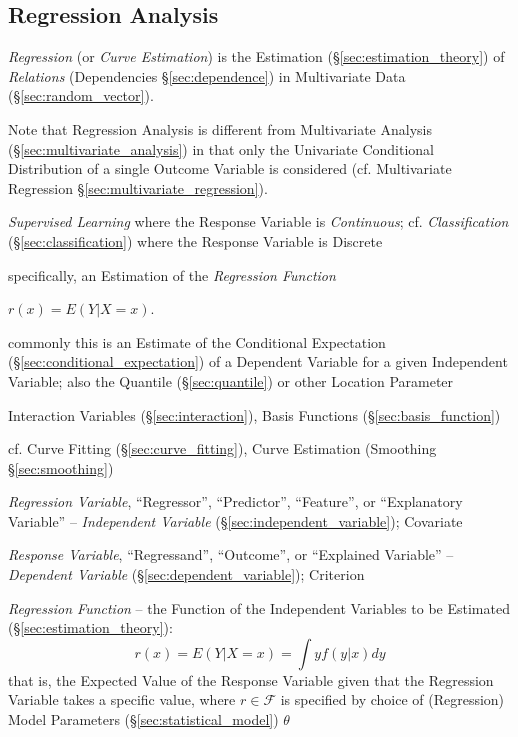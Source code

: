 \subsection{Regression Analysis}\label{sec:regression_analysis}

\emph{Regression} (or \emph{Curve Estimation}) is the Estimation
(\S\ref{sec:estimation_theory}) of \emph{Relations} (Dependencies
\S\ref{sec:dependence}) in Multivariate Data (\S\ref{sec:random_vector}).

Note that Regression Analysis is different from Multivariate Analysis
(\S\ref{sec:multivariate_analysis}) in that only the Univariate Conditional
Distribution of a single Outcome Variable is considered (cf. Multivariate
Regression \S\ref{sec:multivariate_regression}).

\emph{Supervised Learning} where the Response Variable is \emph{Continuous}; cf.
\emph{Classification} (\S\ref{sec:classification}) where the Response Variable
is Discrete

specifically, an Estimation of the \emph{Regression Function}

$r(x) = E(Y | X = x)$.

commonly this is an Estimate of the Conditional Expectation
(\S\ref{sec:conditional_expectation}) of a Dependent Variable for a given
Independent Variable; also the Quantile (\S\ref{sec:quantile}) or other Location
Parameter

Interaction Variables (\S\ref{sec:interaction}), Basis Functions
(\S\ref{sec:basis_function})

\fist cf. Curve Fitting (\S\ref{sec:curve_fitting}), Curve Estimation (Smoothing
\S\ref{sec:smoothing})

\emph{Regression Variable}, ``Regressor'', ``Predictor'', ``Feature'', or
``Explanatory Variable'' -- \emph{Independent Variable}
(\S\ref{sec:independent_variable}); Covariate

\emph{Response Variable}, ``Regressand'', ``Outcome'', or ``Explained Variable''
-- \emph{Dependent Variable} (\S\ref{sec:dependent_variable}); Criterion

\emph{Regression Function} -- the Function of the Independent Variables to be
Estimated (\S\ref{sec:estimation_theory}):
\[
  r(x) = E(Y | X = x) = \int y f(y|x) dy
\]
that is, the Expected Value of the Response Variable given that the Regression
Variable takes a specific value, where $r \in \mathcal{F}$ is specified by
choice of (Regression) Model Parameters (\S\ref{sec:statistical_model}) $\theta$

